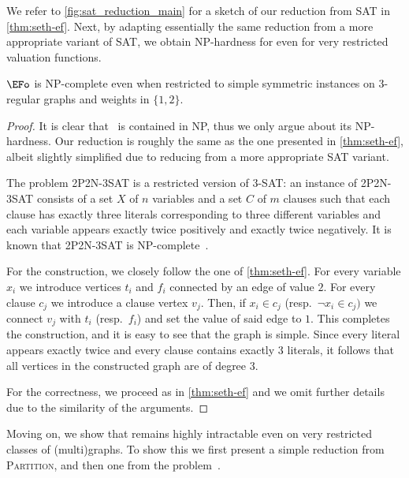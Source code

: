 \documentclass[11pt,letterpaper]{article}
\begin{document}
We refer to \cref{fig:sat_reduction_main} for a sketch of our reduction from SAT in \cref{thm:seth-ef}.
Next, by adapting essentially the same reduction from a more appropriate variant of SAT, we obtain NP-hardness for {\EFo}
even for very restricted valuation functions.


\begin{theoremrep}[\appsymb]\label{thm:npc-ef}
    $\EFo$ is NP-complete even when restricted to simple symmetric instances on $3$-regular graphs and weights in $\{1,2\}$.
\end{theoremrep}


\begin{proof}
    It is clear that \EFo\ is contained in NP, thus we only argue about its NP-hardness.
    Our reduction is roughly the same as the one presented in \cref{thm:seth-ef},
    albeit slightly simplified due to reducing from a more appropriate SAT variant.

    The problem 2P2N-3SAT is a restricted version of 3-SAT:
    an instance of 2P2N-3SAT consists of a set $X$ of $n$ variables and a set $C$ of $m$ clauses such that
    each clause has exactly three literals corresponding to three different variables
    and each variable appears exactly twice positively and exactly twice negatively.
    It is known that 2P2N-3SAT is NP-complete~\cite{eccc/ECCC-TR03-049,dam/DarmannD21}.

    For the construction, we closely follow the one of \cref{thm:seth-ef}.
    For every variable $x_i$ we introduce vertices $t_i$ and $f_i$ connected by an edge of value $2$.
    For every clause $c_j$ we introduce a clause vertex $v_j$.
    Then, if $x_i \in c_j$ (resp.~$\neg x_i \in c_j)$
    we connect $v_j$ with $t_i$ (resp.~$f_i$) and set the value of said edge to $1$.
    This completes the construction, and it is easy to see that the graph is simple.
    Since every literal appears exactly twice and every clause contains exactly $3$ literals,
    it follows that all vertices in the constructed graph are of degree $3$.

    For the correctness, we proceed as in \cref{thm:seth-ef} and we omit further details due to the
    similarity of the arguments.
\end{proof}

Moving on, we show that {\EFo} remains highly intractable even on very restricted classes of (multi)graphs.
To show this we first present a simple reduction from \textsc{Partition},
and then one from the {\TOO} problem~\cite{wg/BodlaenderCW22,dam/BodlaenderS26}.
\end{document}
